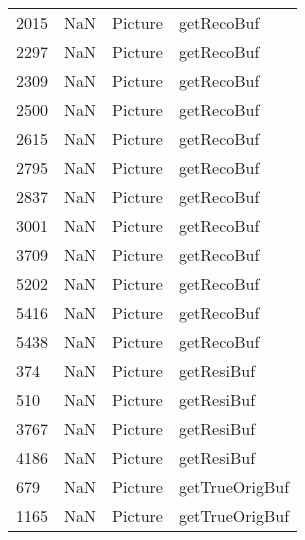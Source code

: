 \begin{tabular}{llll}
2015 &                   NaN &                    Picture &                                getRecoBuf \\
2297 &                   NaN &                    Picture &                                getRecoBuf \\
2309 &                   NaN &                    Picture &                                getRecoBuf \\
2500 &                   NaN &                    Picture &                                getRecoBuf \\
2615 &                   NaN &                    Picture &                                getRecoBuf \\
2795 &                   NaN &                    Picture &                                getRecoBuf \\
2837 &                   NaN &                    Picture &                                getRecoBuf \\
3001 &                   NaN &                    Picture &                                getRecoBuf \\
3709 &                   NaN &                    Picture &                                getRecoBuf \\
5202 &                   NaN &                    Picture &                                getRecoBuf \\
5416 &                   NaN &                    Picture &                                getRecoBuf \\
5438 &                   NaN &                    Picture &                                getRecoBuf \\
374  &                   NaN &                    Picture &                                getResiBuf \\
510  &                   NaN &                    Picture &                                getResiBuf \\
3767 &                   NaN &                    Picture &                                getResiBuf \\
4186 &                   NaN &                    Picture &                                getResiBuf \\
679  &                   NaN &                    Picture &                            getTrueOrigBuf \\
1165 &                   NaN &                    Picture &                            getTrueOrigBuf \\

\end{tabular}
